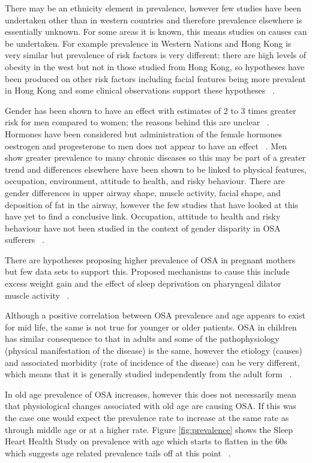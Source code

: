 There may be an ethnicity element in prevalence, however few studies have been undertaken other than in western countries and therefore prevalence elsewhere is essentially unknown. For some areas it is known, this means studies on causes can be undertaken. For example prevalence in Western Nations and Hong Kong is very similar but prevalence of risk factors is very different: there are high levels of obesity in the west but not in those studied from Hong Kong, so hypotheses have been produced on other risk factors including facial features being more prevalent in Hong Kong and some clinical observations support these hypotheses ~\cite{ip2001community}.

Gender has been shown to have an effect with estimates of 2 to 3 times greater risk for men compared to women; the reasons behind this are unclear ~\cite{strohl1996recognition}. Hormones have been considered but administration of the female hormones oestrogen and progesterone to men does not appear to have an effect ~\cite{shaver2000review}. Men show greater prevalence to many chronic diseases so this may be part of a greater trend and differences elsewhere have been shown to be linked to physical features, occupation, environment, attitude to health, and risky behaviour. There are gender differences in upper airway shape, muscle activity, facial shape, and deposition of fat in the airway, however the few studies that have looked at this have yet to find a conclusive link. Occupation, attitude to health and risky behaviour have not been studied in the context of gender disparity in OSA sufferers ~\cite{waldron1985we}.

There are hypotheses proposing higher prevalence of OSA in pregnant mothers but few data sets to support this. Proposed mechanisms to cause this include excess weight gain and the effect of sleep deprivation on pharyngeal dilator muscle activity ~\cite{franklin2000snoring}.

Although a positive correlation between OSA prevalence and age appears to exist for mid life, the same is not true for younger or older patients. OSA in children has similar consequence to that in adults and some of the pathophysiology (physical manifestation of the disease) is the same, however the etiology (causes) and associated morbidity (rate of incidence of the disease) can be very different, which means that it is generally studied independently from the adult form ~\cite{ancoli1991sleep}.

In old age prevalence of OSA increases, however this does not necessarily mean that physiological changes associated with old age are causing OSA. If this was the case one would expect the prevalence rate to increase at the same rate as through middle age or at a higher rate. Figure \ref{fig:prevalence} shows the Sleep Heart Health Study on prevalence with age which starts to flatten in the 60s which suggests age related prevalence tails off at this point ~\cite{young1996sleep}.

